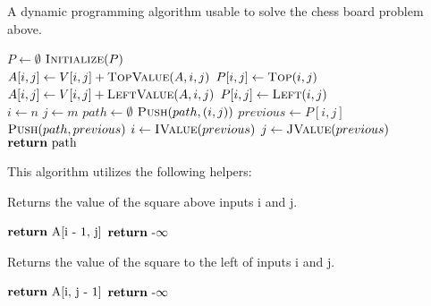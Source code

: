 \documentclass{article}
\begin{document}
\begin{algorithm}[H]
    \caption{
        A dynamic programming algorithm usable to solve the chess board
        problem above.
    }
    \label{alg:algorithm-label}
    \begin{algorithmic}[1]
            \State $ P \gets \emptyset $            
            \State $ \Call{Initialize}{P} $ \\            
                        \State $ A[i, j] \gets V[i, j] + \Call{TopValue}{A, i, j} $                
                        \State $ P[i, j] \gets \Call{Top}{i, j} $
                    \Else
                        \State $ A[i, j] \gets V[i, j] + \Call{LeftValue}{A, i, j} $
                        \State $ P[i, j] \gets \Call{Left}{i, j} $
                    \EndIf
                \EndFor                
            \EndFor            
            \\            
            \State $ i \gets n $
            \State $ j \gets m $
            \State $ path \gets \emptyset $
            \State $ \Call{Push}{path, (i, j)} $
            \Repeat
                \State $ previous \gets P[i, j] $
                \State $ \Call{Push}{path, previous} $
                \State $ i \gets \Call{IValue}{previous} $
                \State $ j \gets \Call{JValue}{previous} $
            \\
            \State $ \Return \text{ path} $
        \EndFunction
    \end{algorithmic}
\end{algorithm}

This algorithm utilizes the following helpers:

\begin{algorithm}[H]
    \caption{
        Returns the value of the square above inputs i and j.
    }
    \label{alg:algorithm-label}
    \begin{algorithmic}[1]
                \State $ \Return \text{ A[i - 1, j]} $
            \Else
                \State $ \Return \text{ -}\infty $
            \EndIf
        \EndFunction
    \end{algorithmic}
\end{algorithm}

\begin{algorithm}[H]
    \caption{
        Returns the value of the square to the left of inputs 
        i and j.
    }
    \label{alg:algorithm-label}
    \begin{algorithmic}[1]
                \State $ \Return \text{ A[i, j - 1]} $
            \Else
                \State $ \Return \text{ -}\infty $
            \EndIf
        \EndFunction
    \end{algorithmic}
\end{algorithm}
\end{document}
